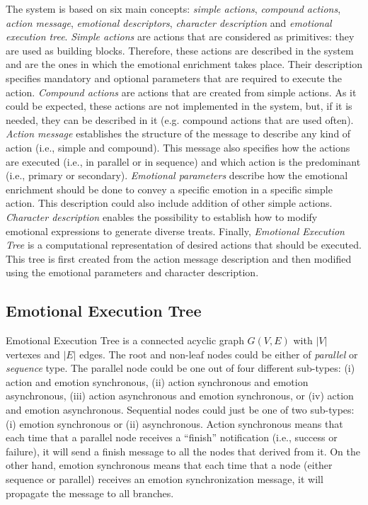\documentclass{sig-alternate-05-2015}
\begin{document}
The system is based on six main concepts: \textit{simple actions}, \textit{compound actions}, \textit{action message}, \textit{emotional descriptors}, \textit{character description} and \textit{emotional execution tree}. \textit{Simple actions} are actions that are considered as primitives: they are used as building blocks. Therefore, these actions are described in the system and are the ones in which the emotional enrichment takes place. Their description specifies mandatory and optional parameters that are required to execute the action. \textit{Compound actions} are actions that are created from simple actions. As it could be expected, these actions are not implemented in the system, but, if it is needed, they can be described in it (e.g. compound actions that are used often). \textit{Action message} establishes the structure of the message to describe any kind of action (i.e., simple and compound). This message also specifies how the actions are executed (i.e., in parallel or in sequence) and which action is the predominant (i.e., primary or secondary). \textit{Emotional parameters} describe how the emotional enrichment should be done to convey a specific emotion in a specific simple action. This description could also include addition of other simple actions. \textit{Character description} enables the possibility to establish how to modify emotional expressions to generate diverse treats. Finally, \textit{Emotional Execution Tree} is a computational representation of desired actions that should be executed. This tree is first created from the action message description and then modified using the emotional parameters and character description.   

\subsection{Emotional Execution Tree}

Emotional Execution Tree is a connected acyclic graph $G(V,E)$ with $|V|$ vertexes and $|E|$ edges. The root and non-leaf nodes could be either of \textit{parallel} or \textit{sequence} type. The parallel node could be one out of four different sub-types: (i) action and emotion synchronous, (ii) action synchronous and emotion asynchronous, (iii) action asynchronous and emotion synchronous, or (iv) action and emotion asynchronous. Sequential nodes could just be one of two sub-types: (i) emotion synchronous or (ii) asynchronous. Action synchronous means that each time that a parallel node receives a ``finish'' notification (i.e., success or failure), it will send a finish message to all the nodes that derived from it. On the other hand, emotion synchronous means that each time that a node (either sequence or parallel) receives an emotion synchronization message, it will propagate the message to all branches. %
 
\end{document}
